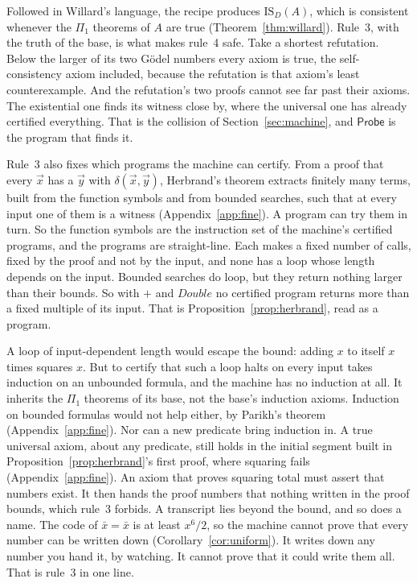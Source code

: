 \documentclass[11pt]{article}
\newcommand{\Prog}[1]{\mathsf{#1}}
\newcommand{\ISD}{\mathrm{IS}_D(A)}
\theoremstyle{plain}
\theoremstyle{definition}
\begin{document}
Followed in Willard's language, the recipe produces $\ISD$, which is
consistent whenever the $\Pi_1$ theorems of $A$ are true
(Theorem~\ref{thm:willard}). Rule~3, with the truth of the base, is what
makes rule~4 safe. Take a shortest refutation. Below the larger of its two
Gödel numbers every axiom is true, the self-consistency axiom included,
because the refutation is that axiom's least counterexample. And the
refutation's two proofs cannot see far past their axioms. The existential
one finds its witness close by, where the universal one has already
certified everything. That is the collision of Section~\ref{sec:machine},
and $\Prog{Probe}$ is the program that finds it.

Rule~3 also fixes which programs the machine can certify. From a proof that
every $\vec x$ has a $\vec y$ with $\delta(\vec x, \vec y)$, Herbrand's
theorem extracts finitely many terms, built from the function symbols and
from bounded searches, such that at every input one of them is a witness
(Appendix~\ref{app:fine}). A program can try them in turn. So the function
symbols are the instruction set of the machine's certified programs, and
the programs are straight-line. Each makes a fixed number of calls, fixed by
the proof and not by the input, and none has a loop whose length depends on
the input. Bounded searches do loop, but they return nothing larger than
their bounds. So with $+$ and $\mathit{Double}$ no certified program returns
more than a fixed multiple of its input. That is
Proposition~\ref{prop:herbrand}, read as a program.

A loop of input-dependent length would escape the bound: adding $x$ to
itself $x$ times squares $x$. But to certify that such a loop halts on every
input takes induction on an unbounded formula, and the machine has no
induction at all. It inherits the $\Pi_1$ theorems of its base, not the
base's induction axioms. Induction on bounded formulas would not help
either, by Parikh's theorem (Appendix~\ref{app:fine}). Nor can a new
predicate bring induction in. A true universal axiom, about any predicate,
still holds in the initial segment built in Proposition~\ref{prop:herbrand}'s
first proof, where squaring fails (Appendix~\ref{app:fine}). An axiom that proves squaring
total must assert that numbers exist. It then hands the proof numbers that
nothing written in the proof bounds, which rule~3 forbids. A transcript lies
beyond the bound, and so does a name. The code of
$\bar x = \bar x$ is at least $x^6/2$, so the machine cannot prove that every
number can be written down (Corollary~\ref{cor:uniform}). It writes down any
number you hand it, by watching. It cannot prove that it could write them
all. That is rule~3 in one line.
\end{document}
